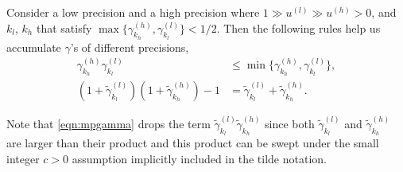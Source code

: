 \documentclass[review,onefignum,onetabnum]{siamart190516}
\begin{document}
\begin{lemma}
	Consider a low precision and a high precision where $1 \gg u^{(l)} \gg u^{(h)}>0$, and $k_l$, $k_h$ that satisfy $\max\{\gamma^{(h)}_{k_{h}},\gamma^{(l)}_{k_{l}}\} < 1/2$.
	Then the following rules help us accumulate $\gamma$'s of different precisions,
	\begin{align}
	\gamma^{(h)}_{k_{h}}\gamma^{(l)}_{k_{l}} &\leq \min\{\gamma^{(h)}_{k_{h}},\gamma^{(l)}_{k_{l}} \},\\ 
	(1+\tilde{\gamma}_{k_l}^{(l)})(1+\tilde{\gamma}_{k_h}^{(h)}) -1 &= \tilde{\gamma}_{k_l}^{(l)}+\tilde{\gamma}_{k_h}^{(h)}. \label{eqn:mpgamma}
	\end{align} 
\end{lemma}
Note that \cref{eqn:mpgamma} drops the term $\tilde{\gamma}_{k_l}^{(l)}\tilde{\gamma}_{k_h}^{(h)}$ since both $\tilde{\gamma}_{k_l}^{(l)}$ and $\tilde{\gamma}_{k_h}^{(h)}$ are larger than their product and this product can be swept under the small integer $c > 0$ assumption implicitly included in the tilde notation.
\end{document}
